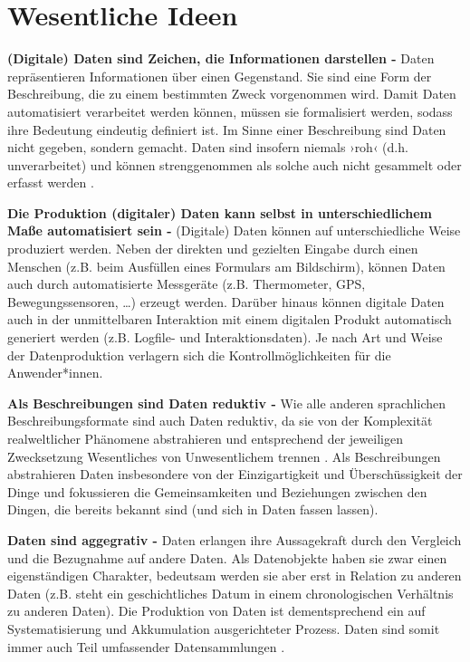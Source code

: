 \documentclass[
  a4paper,
]{book}
\begin{document}
\section{Wesentliche Ideen}\label{wesentliche-ideen-2}

\textbf{(Digitale) Daten sind Zeichen, die Informationen darstellen -} Daten repräsentieren Informationen über einen Gegenstand. Sie sind eine Form der Beschreibung, die zu einem bestimmten Zweck vorgenommen wird. Damit Daten automatisiert verarbeitet werden können, müssen sie formalisiert werden, sodass ihre Bedeutung eindeutig definiert ist. Im Sinne einer Beschreibung sind Daten nicht gegeben, sondern gemacht. Daten sind insofern niemals ›roh‹ (d.h. unverarbeitet) und können strenggenommen als solche auch nicht gesammelt oder erfasst werden \citep[vgl.][]{gitelmanIntroduction2013}.

\textbf{Die Produktion (digitaler) Daten kann selbst in unterschiedlichem Maße automatisiert sein -} (Digitale) Daten können auf unterschiedliche Weise produziert werden. Neben der direkten und gezielten Eingabe durch einen Menschen (z.B. beim Ausfüllen eines Formulars am Bildschirm), können Daten auch durch automatisierte Messgeräte (z.B. Thermometer, GPS, Bewegungssensoren, \ldots) erzeugt werden. Darüber hinaus können digitale Daten auch in der unmittelbaren Interaktion mit einem digitalen Produkt automatisch generiert werden (z.B. Logfile- und Interaktionsdaten). Je nach Art und Weise der Datenproduktion verlagern sich die Kontrollmöglichkeiten für die Anwender*innen.

\textbf{Als Beschreibungen sind Daten reduktiv -} Wie alle anderen sprachlichen Beschreibungsformate sind auch Daten reduktiv, da sie von der Komplexität realweltlicher Phänomene abstrahieren und entsprechend der jeweiligen Zwecksetzung Wesentliches von Unwesentlichem trennen \citep[vgl.][]{floydAutooperationaleFormUnd1997, nakeAlgorithmischeZeichen2001}. Als Beschreibungen abstrahieren Daten insbesondere von der Einzigartigkeit und Überschüssigkeit der Dinge und fokussieren die Gemeinsamkeiten und Beziehungen zwischen den Dingen, die bereits bekannt sind (und sich in Daten fassen lassen).

\textbf{Daten sind aggegrativ -} Daten erlangen ihre Aussagekraft durch den Vergleich und die Bezugnahme auf andere Daten. Als Datenobjekte haben sie zwar einen eigenständigen Charakter, bedeutsam werden sie aber erst in Relation zu anderen Daten (z.B. steht ein geschichtliches Datum in einem chronologischen Verhältnis zu anderen Daten). Die Produktion von Daten ist dementsprechend ein auf Systematisierung und Akkumulation ausgerichteter Prozess. Daten sind somit immer auch Teil umfassender Datensammlungen \citep[vgl.][]{giessmannWasIstDatenkritik2014}.
\end{document}
